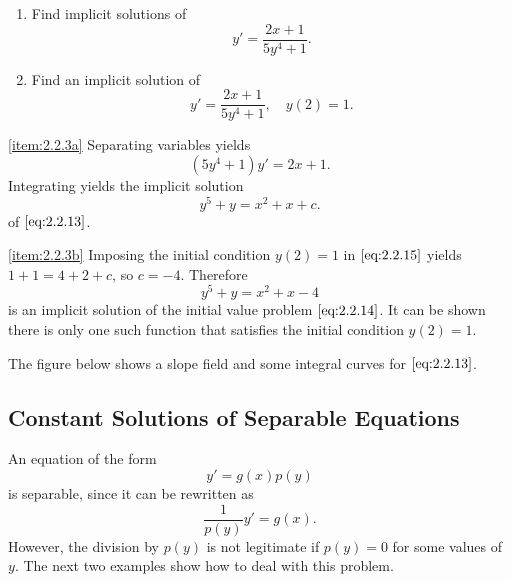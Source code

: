 \documentclass{ximera}
\begin{document}
\begin{example}\label{example:2.2.3}
\begin{enumerate}
\item\label{item:2.2.3a}
Find implicit solutions of
\begin{equation} \label{eq:2.2.13}
y'=\frac{2x+1}{5y^4+1}.
\end{equation}
\item\label{item:2.2.3b}
Find an implicit solution of
\begin{equation} \label{eq:2.2.14}
y'=\frac{2x+1}{5y^4+1},\quad y(2)=1.
\end{equation}
\end{enumerate}
 
\begin{explanation}
\ref{item:2.2.3a}
 Separating variables yields
$$
(5y^4+1)y'=2x+1.
$$
Integrating yields the implicit solution
\begin{equation} \label{eq:2.2.15}
y^5+y=x^2+x+ c.
\end{equation}
of $\eqref{eq:2.2.13}$.
 
\ref{item:2.2.3b} Imposing the initial condition $y(2)=1$ in
$\eqref{eq:2.2.15}$ yields $1+1=4+2+c$, so $c=-4$. Therefore
$$
y^5+y=x^2+x-4
$$
is an implicit solution of the initial value problem $\eqref{eq:2.2.14}$.
It can be shown there is only one such function that satisfies the initial condition $y(2)=1.$
 
The figure below shows a slope field and some integral curves
for $\eqref{eq:2.2.13}$.

\begin{center}
\end{center}
 
 
\end{explanation}
\end{example}
 
\subsection*{Constant Solutions of Separable Equations}
 
An equation of the form
$$
y'=g(x)p(y)
$$
 is separable, since it can be rewritten as
$$
\frac{1}{p(y)}y'=g(x).
$$
 However, the division by  $p(y)$
is not legitimate  if $p(y)=0$ for some values of $y$.  The
next two examples show how to deal with this problem.
 
\end{document}
